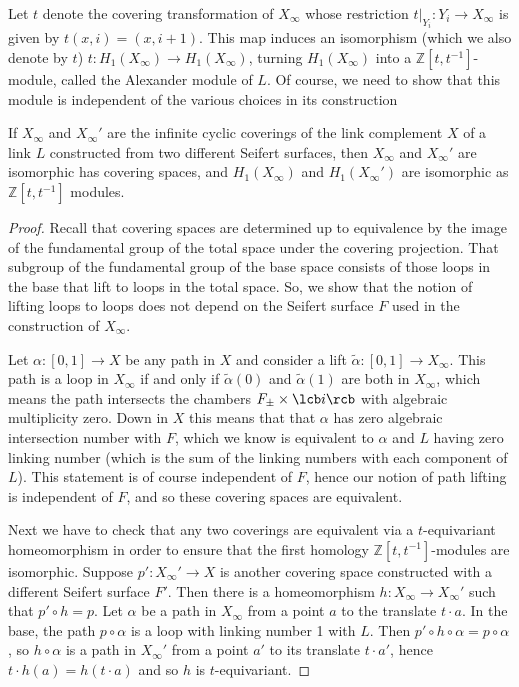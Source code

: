 Let $t$ denote the covering transformation of $X_\infty$ whose restriction $t|_{Y_i} : Y_i \rightarrow X_\infty$ is given by $t(x,i) = (x,i+1)$. This map induces an isomorphism (which we also denote by $t$) $t : H_1(X_\infty) \rightarrow H_1(X_\infty)$, turning $H_1(X_\infty)$ into a $\mathbb Z[t,t^{-1}]$-module, called the Alexander module of $L$. Of course, we need to show that this module is independent of the various choices in its construction

\begin{prop}
If $X_\infty$ and $X_\infty'$ are the infinite cyclic coverings of the link complement $X$ of a link $L$ constructed from two different Seifert surfaces, then $X_\infty$ and $X_\infty'$ are isomorphic has covering spaces, and $H_1(X_\infty)$ and $H_1(X_\infty')$ are isomorphic as $\mathbb Z[t,t^{-1}]$ modules.
\end{prop}
\begin{proof}
Recall that covering spaces are determined up to equivalence by the image of the fundamental group of the total space under the covering projection. That subgroup of the fundamental group of the base space consists of those loops in the base that lift to loops in the total space. So, we show that the notion of lifting loops to loops does not depend on the Seifert surface $F$ used in the construction of $X_\infty$.

Let $\alpha : [0,1] \rightarrow X$ be any path in $X$ and consider a lift $\tilde\alpha : [0,1] \rightarrow X_\infty$. This path is a loop in $X_\infty$ if and only if $\tilde\alpha(0)$ and $\tilde\alpha(1)$ are both in $X_\infty$, which means the path intersects the chambers $F_\pm \times \lcb i \rcb$ with algebraic multiplicity zero. Down in $X$ this means that that $\alpha$ has zero algebraic intersection number with $F$, which we know is equivalent to $\alpha$ and $L$ having zero linking number (which is the sum of the linking numbers with each component of $L$). This statement is of course independent of $F$, hence our notion of path lifting is independent of $F$, and so these covering spaces are equivalent.

Next we have to check that any two coverings are equivalent via a $t$-equivariant homeomorphism in order to ensure that the first homology $\mathbb Z[t,t^{-1}]$-modules are isomorphic. Suppose $p' : X_\infty' \rightarrow X$ is another covering space constructed with a different Seifert surface $F'$. Then there is a homeomorphism $h : X_\infty \rightarrow X_\infty'$ such that $p' \circ h = p$. Let $\alpha$ be a path in $X_\infty$ from a point $a$ to the translate $t \cdot a$. In the base, the path $p \circ \alpha$ is a loop with linking number 1 with $L$. Then $p' \circ h \circ \alpha = p \circ \alpha$, so $h \circ \alpha$ is a path in $X_\infty'$ from a point $a'$ to its translate $t \cdot a'$, hence $t \cdot h(a) = h(t \cdot a)$ and so $h$ is $t$-equivariant.
\end{proof}

